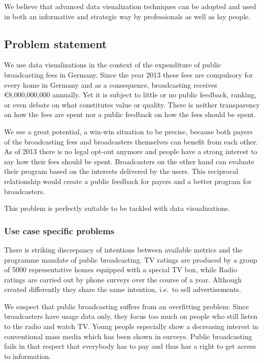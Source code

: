 \documentclass{article}
\begin{document}
We believe that advanced data visualization techniques can be adopted and used in both an informative and strategic way by professionals as well as lay people.

\subsection{Problem statement}

We use data visualizations in the context of the expenditure of public broadcasting fees in Germany.
Since the year 2013 these fees are compulsory for every home in Germany and as a consequence, broadcasting receives €8,000,000,000 annually.
Yet it is subject to little or no public feedback, ranking, or even debate on what constitutes value or quality.
There is neither transparency on how the fees are spent nor a public feedback on how the fees should be spent.

We see a great potential, a win-win situation to be precise, because both payers of the broadcasting fees and broadcasters themselves can benefit from each other.
As of 2013 there is no legal opt-out anymore and people have a strong interest to say how their fees should be spent.
Broadcasters on the other hand can evaluate their program based on the interests delivered by the users.
This reciprocal relationship would create a public feedback for payers and a better program for broadcasters.

This problem is perfectly suitable to be tackled with data visualizations.

\subsubsection{Use case specific problems}
There is striking discrepancy of intentions between available metrics and the programme mandate of public broadcasting.
TV ratings are produced by a group of 5000 representative homes equipped with a special TV box, while Radio ratings are carried out by phone surveys over the course of a year.
Although created differently they share the same intention, i.e.\ to sell advertisements.

We suspect that public broadcasting suffers from an overfitting problem:
Since broadcasters have usage data only, they focus too much on people who still listen to the radio and watch TV.
Young people especially show a decreasing interest in conventional mass media which has been shown in surveys.
Public broadcasting fails in that respect that everybody has to pay and thus has a right to get access to information.
\end{document}

